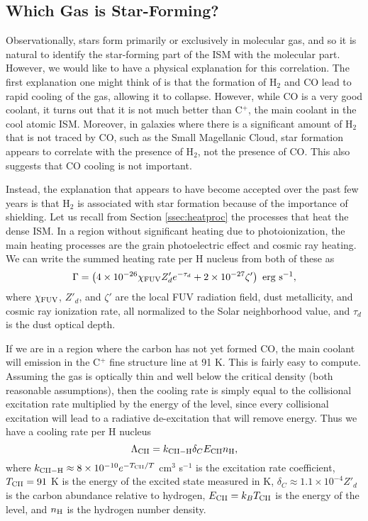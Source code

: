 \subsection{Which Gas is Star-Forming?}

Observationally, stars form primarily or exclusively in molecular gas, and so it is natural to identify the star-forming part of the ISM with the molecular part. However, we would like to have a physical explanation for this correlation. The first explanation one might think of is that the formation of H$_2$ and CO lead to rapid cooling of the gas, allowing it to collapse. However, while CO is a very good coolant, it turns out that it is not much better than C$^+$, the main coolant in the cool atomic ISM. Moreover, in galaxies where there is a significant amount of H$_2$ that is not traced by CO, such as the Small Magellanic Cloud, star formation appears to correlate with the presence of H$_2$, not the presence of CO. This also suggests that CO cooling is not important.

Instead, the explanation that appears to have become accepted over the past few years is that H$_2$ is associated with star formation because of the importance of shielding. Let us recall from Section \ref{ssec:heatproc} the processes that heat the dense ISM. In a region without significant heating due to photoionization, the main heating processes are the grain photoelectric effect and cosmic ray heating. We can write the summed heating rate per H nucleus from both of these as
\begin{equation}
\Gamma = \left(4\times 10^{-26} \chi_{\rm FUV} Z'_d e^{-\tau_d} + 2\times 10^{-27} \zeta'\right) \mbox{ erg s}^{-1},
\end{equation}
where $\chi_{\rm FUV}$, $Z'_d$, and $\zeta'$ are the local FUV radiation field, dust metallicity, and cosmic ray ionization rate, all normalized to the Solar neighborhood value, and $\tau_d$ is the dust optical depth.

If we are in a region where the carbon has not yet formed CO, the main coolant will emission in the C$^+$ fine structure line at 91 K. This is fairly easy to compute. Assuming the gas is optically thin and well below the critical density (both reasonable assumptions), then the cooling rate is simply equal to the collisional excitation rate multiplied by the energy of the level, since every collisional excitation will lead to a radiative de-excitation that will remove energy. Thus we have a cooling rate per H nucleus
\begin{equation}
\Lambda_{\rm CII} = k_{\rm CII-H} \delta_C E_{\rm CII} n_{\rm H},
\end{equation}
where $k_{\rm CII-H} \approx 8\times 10^{-10} e^{-T_{\rm CII}/T}$ cm$^3$ s$^{-1}$ is the excitation rate coefficient, $T_{\rm CII} = 91$ K is the energy of the excited state measured in K, $\delta_C\approx 1.1\times 10^{-4} Z'_d$ is the carbon abundance relative to hydrogen, $E_{\rm CII} = k_B T_{\rm CII}$ is the energy of the level, and $n_{\rm H}$ is the hydrogen number density.


